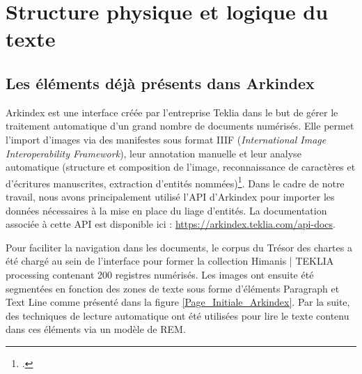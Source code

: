 \documentclass[a4paper,12pt,twoside]{book}
\begin{document}
	\section{Structure physique et logique du texte}
	
	\subsection{Les éléments déjà présents dans Arkindex}
	
	Arkindex est une interface créée par l'entreprise Teklia dans le but de gérer le traitement automatique d'un grand nombre de documents numérisés. Elle permet l'import d'images via des manifestes sous format IIIF (\textit{International Image Interoperability Framework}), leur annotation manuelle et leur analyse automatique (structure et composition de l'image, reconnaissance de caractères et d'écritures manuscrites, extraction d'entités nommées)\footcite{monroc_comprehensive_2022}. Dans le cadre de notre travail, nous avons principalement utilisé l'API d'Arkindex pour importer les données nécessaires à la mise en place du liage d'entités. La documentation associée à cette API est disponible ici : \url{https://arkindex.teklia.com/api-docs}.
	
	Pour faciliter la navigation dans les documents, le corpus du Trésor des chartes a été chargé au sein de l'interface pour former la collection \og Himanis | TEKLIA processing\fg{} contenant 200 registres numérisés. Les images ont ensuite été segmentées en fonction des zones de texte sous forme d'éléments \og Paragraph\fg{} et \og Text Line\fg{} comme présenté dans la figure \ref{Page_Initiale_Arkindex}. Par la suite, des techniques de lecture automatique ont été utilisées pour lire le texte contenu dans ces éléments via un modèle de REM.
	
\end{document}
